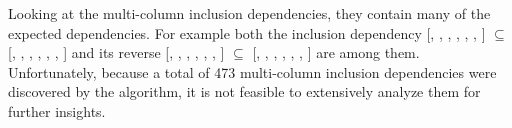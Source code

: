 Looking at the multi-column inclusion dependencies, they contain many of the expected dependencies. For example both the inclusion dependency [, , , , , , ] $\subseteq$ [, , , , , , ] and its reverse [, , , , , , ] $\subseteq$ [, , , , , , ] are among them. Unfortunately, because a total of 473 multi-column inclusion dependencies were discovered by the algorithm, it is not feasible to extensively analyze them for further insights.
